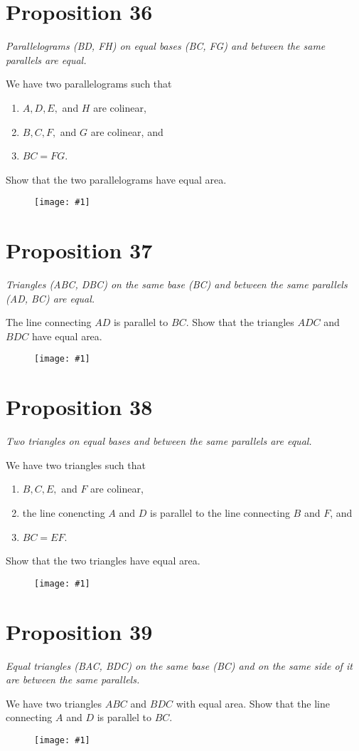 \documentclass[openany]{book}
\newcommand{\diagram}[1]{
    \vspace*{\fill}
    \begin{figure}[H]
        \centering
        \texttt{[image: \#1]}
    \end{figure}
    \vspace*{\fill}
}
\newenvironment{proposition}
    {\begin{center}\em}
    {\end{center}}
\begin{document}
    \clearpage
    \section{Proposition 36}
    \begin{proposition}
    Parallelograms (BD, FH) on equal bases (BC, FG) and between the same parallels are equal.
    \end{proposition}
    We have two parallelograms such that
    \begin{enumerate}
        \item $A, D, E,$ and $H$ are colinear,
        \item $B, C, F,$ and $G$ are colinear, and
        \item $BC = FG$.
    \end{enumerate}
    Show that the two parallelograms have equal area.
    \diagram{prop36.pdf}


    \clearpage
    \section{Proposition 37}
    \begin{proposition}
    Triangles (ABC, DBC) on the same base (BC) and between the same parallels (AD, BC) are equal.
    \end{proposition}
    The line connecting $AD$ is parallel to $BC$. Show that the triangles $ADC$ and $BDC$ have equal area.
    \diagram{prop37.pdf}


    \clearpage
    \section{Proposition 38}
    \begin{proposition}
    Two triangles on equal bases and between the same parallels are equal.
    \end{proposition}
    We have two triangles such that
    \begin{enumerate}
        \item $B, C, E,$ and $F$ are colinear,
        \item the line conencting $A$ and $D$ is parallel to the line connecting $B$ and $F$, and
        \item $BC = EF$.
    \end{enumerate}
    Show that the two triangles have equal area.
    \diagram{prop38.pdf}


    \clearpage
    \section{Proposition 39}
    \begin{proposition}
    Equal triangles (BAC, BDC) on the same base (BC) and on the same side of it are between the same parallels.
    \end{proposition}
    We have two triangles $ABC$ and $BDC$ with equal area. Show that the line connecting $A$ and $D$ is parallel to $BC$.
    \diagram{prop39.pdf}
\end{document}
